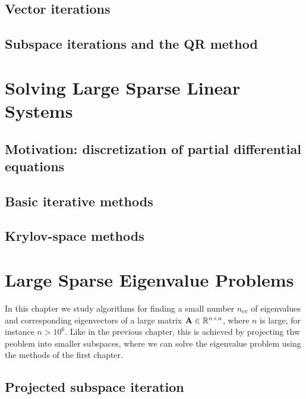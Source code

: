\section{Vector iterations}


\section{Subspace iterations and the QR method}


%

\chapter{Solving Large Sparse Linear Systems}

\section{Motivation: discretization of partial differential equations}



\section{Basic iterative methods}


\section{Krylov-space methods}


\chapter{Large Sparse Eigenvalue Problems}

\begin{intro}
  In this chapter we study algorithms for finding a small number
  $n_{\text{ev}}$ of eigenvalues and corresponding eigenvectors of a
  large matrix $\mathbf A\in\mathbb R^{n\times n}$, where $n$ is large, for instance
  $n>10^6$. Like in the previous chapter, this is achieved by
  projecting thw peoblem into smaller subspaces, where we can solve
  the eigenvalue problem using the methods of the first chapter.
\end{intro}

\section{Projected subspace iteration}


